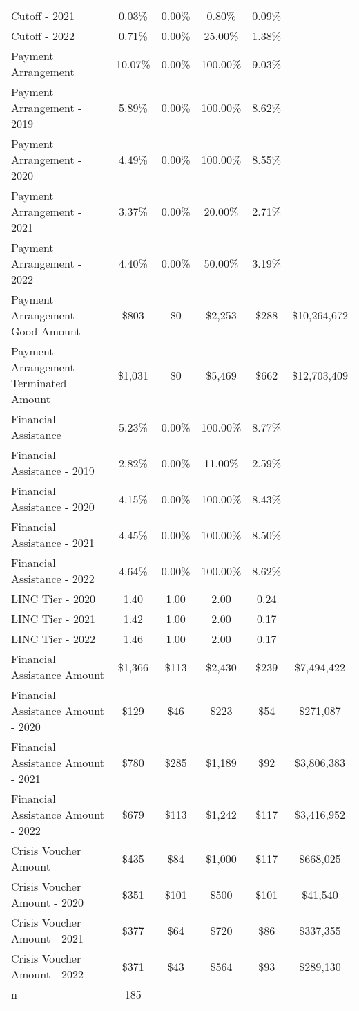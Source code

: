 \begin{tabular}{l|c|c|c|c|c}
\quad Cutoff - 2021 & 0.03\% & 0.00\% & 0.80\% & 0.09\% \\
\quad Cutoff - 2022 & 0.71\% & 0.00\% & 25.00\% & 1.38\% \\
\midrule 
Payment Arrangement & 10.07\% & 0.00\% & 100.00\% & 9.03\% \\
\quad Payment Arrangement - 2019 & 5.89\% & 0.00\% & 100.00\% & 8.62\% \\
\quad Payment Arrangement - 2020 & 4.49\% & 0.00\% & 100.00\% & 8.55\% \\
\quad Payment Arrangement - 2021 & 3.37\% & 0.00\% & 20.00\% & 2.71\% \\
\quad Payment Arrangement - 2022 & 4.40\% & 0.00\% & 50.00\% & 3.19\% \\
\quad Payment Arrangement - Good Amount & \$803 & \$0 & \$2,253 & \$288 & \$10,264,672 \\
\quad Payment Arrangement - Terminated Amount & \$1,031 & \$0 & \$5,469 & \$662 & \$12,703,409 \\
\midrule 
Financial Assistance & 5.23\% & 0.00\% & 100.00\% & 8.77\% \\
\quad Financial Assistance - 2019 & 2.82\% & 0.00\% & 11.00\% & 2.59\% \\
\quad Financial Assistance - 2020 & 4.15\% & 0.00\% & 100.00\% & 8.43\% \\
\quad Financial Assistance - 2021 & 4.45\% & 0.00\% & 100.00\% & 8.50\% \\
\quad Financial Assistance - 2022 & 4.64\% & 0.00\% & 100.00\% & 8.62\% \\
\midrule 
LINC Tier - 2020 & 1.40 & 1.00 & 2.00 & 0.24 \\
LINC Tier - 2021 & 1.42 & 1.00 & 2.00 & 0.17 \\
LINC Tier - 2022 & 1.46 & 1.00 & 2.00 & 0.17 \\
\midrule 
Financial Assistance Amount & \$1,366 & \$113 & \$2,430 & \$239 & \$7,494,422 \\
\quad Financial Assistance Amount - 2020 & \$129 & \$46 & \$223 & \$54 & \$271,087 \\
\quad Financial Assistance Amount - 2021 & \$780 & \$285 & \$1,189 & \$92 & \$3,806,383 \\
\quad Financial Assistance Amount - 2022 & \$679 & \$113 & \$1,242 & \$117 & \$3,416,952 \\
\midrule 
Crisis Voucher Amount & \$435 & \$84 & \$1,000 & \$117 & \$668,025 \\
\quad Crisis Voucher Amount - 2020 & \$351 & \$101 & \$500 & \$101 & \$41,540 \\
\quad Crisis Voucher Amount - 2021 & \$377 & \$64 & \$720 & \$86 & \$337,355 \\
\quad Crisis Voucher Amount - 2022 & \$371 & \$43 & \$564 & \$93 & \$289,130 \\
\midrule 
n & 185 &  &  &  &  \\
\midrule 
\bottomrule 
\end{tabular}
